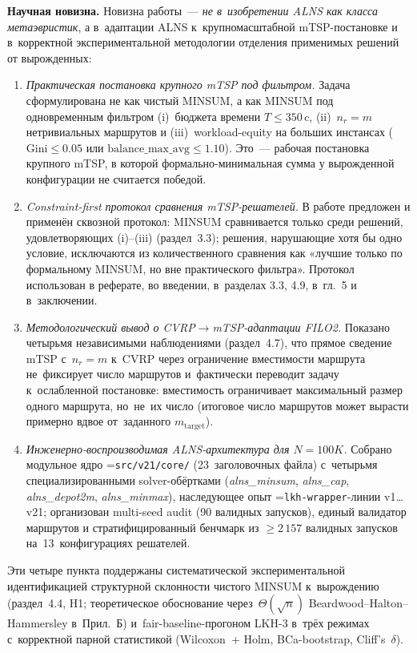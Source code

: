 \documentclass[a4paper,14pt]{extreport}
\makeatletter
\let\old@texttt\texttt
\renewcommand{\texttt}[1]{{\sloppy\hyphenchar\font=\m@ne\old@texttt{#1}}}
\makeatother
\begin{document}
\medskip
\textbf{Научная новизна.} Новизна работы~--- \emph{не в~изобретении ALNS как класса метаэвристик}, а в~адаптации ALNS к~крупномасштабной mTSP-постановке и в~корректной экспериментальной методологии отделения применимых решений от вырожденных:
\begin{enumerate}\itemsep1pt
\item \emph{Практическая постановка крупного mTSP под фильтром.} Задача сформулирована не как чистый MINSUM, а как MINSUM под одновременным фильтром (i)~бюджета времени $T\leq 350$\,c, (ii)~$n_r=m$ нетривиальных маршрутов и (iii)~workload-equity на больших инстансах ($\mathrm{Gini}\leq 0.05$ или $\mathrm{balance\_max\_avg}\leq 1.10$). Это~--- рабочая постановка крупного mTSP, в которой формально-минимальная сумма у вырожденной конфигурации не считается победой.
\item \emph{Constraint-first протокол сравнения mTSP-решателей.} В работе предложен и применён сквозной протокол: MINSUM сравнивается только среди решений, удовлетворяющих (i)--(iii) (раздел~3.3); решения, нарушающие хотя бы одно условие, исключаются из количественного сравнения как «лучшие только по формальному MINSUM, но вне практического фильтра». Протокол использован в реферате, во введении, в~разделах 3.3, 4.9, в~гл.~5 и в~заключении.
\item \emph{Методологический вывод о CVRP$\to$mTSP-адаптации FILO2.} Показано четырьмя независимыми наблюдениями (раздел~4.7), что прямое сведение mTSP с~$n_r=m$ к~CVRP через ограничение вместимости маршрута не~фиксирует число маршрутов и~фактически переводит задачу к~ослабленной постановке: вместимость ограничивает максимальный размер одного маршрута, но~не~их число (итоговое число маршрутов может вырасти примерно вдвое от~заданного $m_\mathrm{target}$).
\item \emph{Инженерно-воспроизводимая ALNS-архитектура для $N=100K$.} Собрано модульное ядро \texttt{src/v21/core/} (23~заголовочных файла) с~четырьмя специализированными solver-обёртками (\emph{alns\_minsum}, \emph{alns\_cap}, \emph{alns\_depot2m}, \emph{alns\_minmax}), наследующее опыт \texttt{lkh-wrapper}-линии v1\dots v21; организован multi-seed audit (90 валидных запусков), единый валидатор маршрутов и стратифицированный бенчмарк из ${\geq}2\,157$ валидных запусков на~13~конфигурациях решателей.
\end{enumerate}
Эти четыре пункта поддержаны систематической экспериментальной идентификацией структурной склонности чистого MINSUM к~вырождению (раздел~4.4, H1; теоретическое обоснование через~$\Theta(\sqrt{n})$ Beardwood--Halton--Hammersley в~Прил.~Б) и~fair-baseline-прогоном LKH-3 в~трёх режимах с~корректной парной статистикой (Wilcoxon~+ Holm, BCa-bootstrap, Cliff's~$\delta$).
\end{document}

